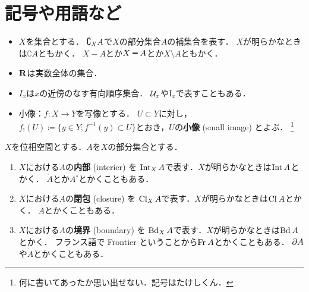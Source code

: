\section*{記号や用語など}
\begin{itemize}
    \item \(X\)を集合とする．
    \(\dip \complement_X A\)で\(X\)の部分集合\(A\)の補集合を表す．
    \(X\)が明らかなときは\(\complement{A}\)ともかく．
    \(X-A\)とか\(X\smi A\)とか\(X\setminus A\)ともかく．
    \item \(\rr\)は実数全体の集合．
    \item \(I_x\)は\(x\)の近傍のなす有向順序集合．
    \({\cU}_x\)や\(\mathrm{I}_x\)で表すこともある．
    \item 小像：\(f\colon X\to Y\)を写像とする．
    \(U\subset Y\)に対し，\(
        f_!(U)\coloneqq\{y\in Y; f^{-1}(y)\subset U\}
    \)とおき，\(U\)の\textbf{小像} (small image) とよぶ．
    \footnote{何に書いてあったか思い出せない．記号はたけしくん．}
\end{itemize}

\(X\)を位相空間とする．\(A\)を\(X\)の部分集合とする．
\begin{enumerate}
    \item \(X\)における\(A\)の\textbf{内部} (interier) を
    \(\Int[X]A\)で表す．\(X\)が明らかなときは\(\Int{A}\)とかく．
    \(\mathring{A}\)とか\(A^{\circ}\)とかくこともある．
    \item \(X\)における\(A\)の\textbf{閉包} (closure) を
    \(\Cl[X]A\)で表す．\(X\)が明らかなときは\(\Cl{A}\)とかく．
    \(\overline{A}\)とかくこともある．
    \item \(X\)における\(A\)の\textbf{境界} (boundary) を
    \(\Bd[X]A\)で表す．\(X\)が明らかなときは\(\Bd{A}\)とかく．
    フランス語で Frontier ということから\(\Fr A\)とかくこともある．
    \(\p{A}\)や\(\dot{A}\)とかくこともある．
\end{enumerate}


